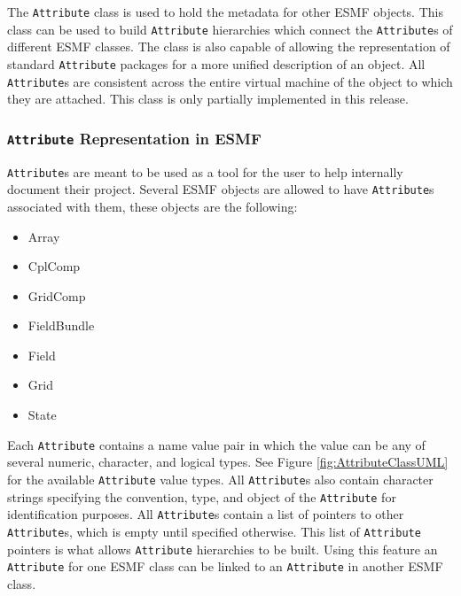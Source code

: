 %

The {\tt Attribute} class is used to hold the metadata for other ESMF objects.  This class can be used to build {\tt Attribute} hierarchies which connect the {\tt Attribute}s of different ESMF classes.  The class is also capable of allowing the representation of standard {\tt Attribute} packages for a more unified description of an object.  All {\tt Attribute}s are consistent across the entire virtual machine of the object to which they are attached.  This class is only partially implemented in this release.

\subsubsection{{\tt Attribute} Representation in ESMF}

{\tt Attribute}s are meant to be used as a tool for the user to help internally document their project.   Several ESMF objects are allowed to have {\tt Attribute}s associated with them, these objects are the following:

\begin{itemize}
\item Array
\item CplComp
\item GridComp
\item FieldBundle
\item Field
\item Grid
\item State
\end{itemize}

Each {\tt Attribute} contains a name value pair in which the value can be any of several numeric, character, and logical types.  See Figure \ref{fig:AttributeClassUML} for the available {\tt Attribute} value types.  All {\tt Attribute}s also contain character strings specifying the convention, type, and object of the {\tt Attribute} for identification purposes.  All {\tt Attribute}s contain a list of pointers to other {\tt Attribute}s, which is empty until specified otherwise.  This list of {\tt Attribute} pointers is what allows {\tt Attribute} hierarchies to be built.  Using this feature an {\tt Attribute} for one ESMF class can be linked to an {\tt Attribute} in another ESMF class.

